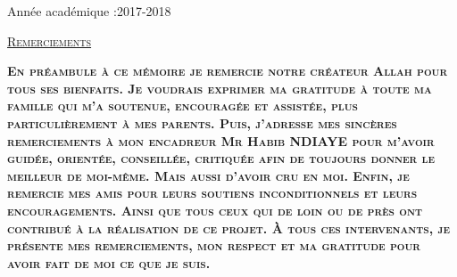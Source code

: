 \documentclass[12pt, openany]{report}
\begin{document}
\begin{titlepage}
\begin{sffamily}
\begin{center}
\begin{minipage}{0.4\textwidth}
\begin{flushright}
      \end{flushright}
    \end{minipage}

    \vfill

    {\large {}Année académique :2017-2018}

  \end{center}
  \end{sffamily}
\end{titlepage}
\newpage
   \thispagestyle{empty}
   \newpage

\newpage
   \thispagestyle{empty}

  \vfill




  \vfill

\newpage

   \begin{center}
    \LARGE
       \underline{\textsc{Remerciements}}
    \end{center}



    \LARGE

   \textbf{
   \textsc{
En préambule à ce mémoire je remercie notre créateur Allah pour tous ses bienfaits. Je voudrais exprimer ma gratitude à toute ma famille qui m'a soutenue, encouragée et assistée, plus particulièrement à mes parents. Puis, j'adresse mes sincères remerciements à mon encadreur Mr Habib NDIAYE pour m'avoir guidée, orientée, conseillée, critiquée afin de toujours donner le meilleur de moi-même. Mais aussi d'avoir cru en moi. Enfin, je remercie mes amis pour leurs soutiens inconditionnels et leurs encouragements. Ainsi que tous ceux qui de loin ou de près ont contribué à la réalisation de ce projet. À tous ces intervenants, je présente mes remerciements, mon respect et ma gratitude pour avoir fait de moi ce que je suis.}
 }
\end{document}

